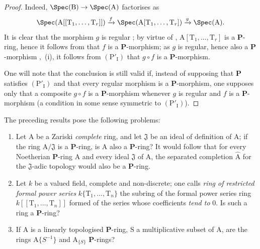 \begin{proof}
Indeed, $\Spec(\mathrm{B})\to\Spec(\mathrm{A})$ factorises as
\[
  \Spec(\mathrm{A}[[\mathrm{T}_1,\ldots,\mathrm{T}_r]])\xrightarrow{f}\Spec(\mathrm{A}[\mathrm{T}_1,\ldots,\mathrm{T}_r])\xrightarrow{g}\Spec(\mathrm{A}).
\]
It is clear that the morphism $g$ is regular ; by virtue of , $\mathrm{A}[\mathrm{T}_1,\ldots,\mathrm{T}_r]$ is a $\boldsymbol{P}$-ring, hence it follows from  that $f$ is a $\boldsymbol{P}$-morphism; as $g$ is regular, hence also a $\boldsymbol{P}$-morphism ,~(i), it follows from $(\mathrm{P}'_\mathrm{I})$ that $g\circ f$ is a $\boldsymbol{P}$-morphism.

One will note that the conclusion is still valid if, instead of supposing that $\boldsymbol{P}$ satisfies $(\mathrm{P}'_\mathrm{I})$ and that every regular morphism is a $\boldsymbol{P}$-morphism, one supposes only that a composite $g\circ f$ is a $\boldsymbol{P}$-morphism whenever $g$ is regular and $f$ is a $\boldsymbol{P}$-morphism (a condition in some sense symmetric to $(\mathrm{P}'_\mathrm{I})$).
\end{proof}

\begin{remark}[7.4.8]
\label{IV.7.4.8}
The preceding results pose the following problems:
\begin{enumerate}[label=\rm\Alph*)]
  \item Let $\mathrm{A}$ be a Zariski \emph{complete} ring, and let $\mathfrak{J}$ be an ideal of definition of $\mathrm{A}$; if the ring $\mathrm{A}/\mathfrak{J}$ is a $\boldsymbol{P}$-ring, is $\mathrm{A}$ also a $\boldsymbol{P}$-ring?
  It would follow that for every Noetherian $\boldsymbol{P}$-ring $\mathrm{A}$ and every ideal $\mathfrak{J}$ of $\mathrm{A}$, the separated completion $\widehat{\mathrm{A}}$ for the $\mathfrak{J}$-adic topology would also be a $\boldsymbol{P}$-ring.
  \item Let $k$ be a valued field, complete and non-discrete; one calls \emph{ring of restricted formal power series} $k\{\mathrm{T}_1,\ldots,\mathrm{T}_n\}$ the subring of the formal power series ring $k[[\mathrm{T}_1,\ldots,\mathrm{T}_n]]$ formed of the series whose coefficients \emph{tend to} $0$.
  Is such a ring a $\boldsymbol{P}$-ring?
  \item If $\mathrm{A}$ is a linearly topologised $\boldsymbol{P}$-ring, $\mathrm{S}$ a multiplicative subset of $\mathrm{A}$, are the rings $\mathrm{A}\{S^{-1}\}$  and $\mathrm{A}_{\{S\}}$  $\boldsymbol{P}$-rings?
\end{enumerate}
\end{remark}


